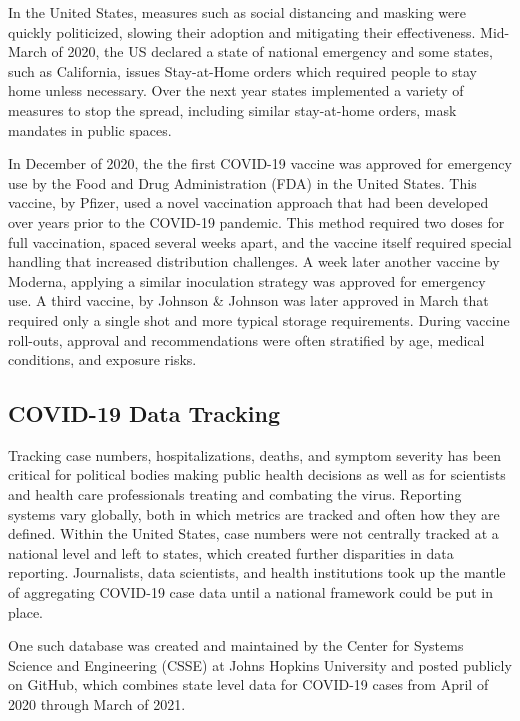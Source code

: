 \documentclass[11pt]{article}
\begin{document}
 In the United States, measures such as social distancing and masking were quickly politicized, slowing their adoption and mitigating their effectiveness. Mid-March of 2020, the US declared a state of national emergency and some states, such as California, issues Stay-at-Home orders which required people to stay home unless necessary. Over the next year states implemented a variety of measures to stop the spread, including similar stay-at-home orders, mask mandates in public spaces. 
 
 In December of 2020, the the first COVID-19 vaccine was approved for emergency use by the Food and Drug Administration (FDA) in the United States. This vaccine, by Pfizer, used a novel vaccination approach that had been developed over years prior to the COVID-19 pandemic. This method required two doses for full vaccination, spaced several weeks apart, and the vaccine itself required special handling that increased distribution challenges. A week later another vaccine by Moderna, applying a similar inoculation strategy was approved for emergency use. A third vaccine, by Johnson \& Johnson was later approved in March that required only a single shot and more typical storage requirements. 
 During vaccine roll-outs, approval and recommendations were often stratified by age, medical conditions, and exposure risks. 
 
	
 
 \subsection{COVID-19 Data Tracking}
	
	Tracking case numbers, hospitalizations, deaths, and symptom severity has been critical for political bodies making public health decisions as well as for scientists and health care professionals treating and combating the virus. Reporting systems vary globally, both in which metrics are tracked and often how they are defined. Within the United States, case numbers were not centrally tracked at a national level and left to states, which created further disparities in data reporting. Journalists, data scientists, and health institutions took up the mantle of aggregating COVID-19 case data until a national framework could be put in place. 
	
	One such database was created and maintained by the  Center for Systems Science and Engineering (CSSE) at Johns Hopkins University and posted publicly on GitHub, which combines state level data for COVID-19 cases from April of 2020 through March of 2021. 
	
\end{document}
